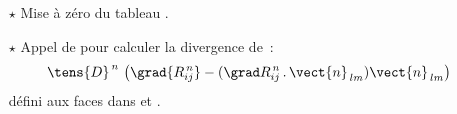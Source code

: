 \begin{itemize}
\begin{itemize}
\begin{itemize}
\item [$\Rightarrow$] calcul de
 $\left[\grad{R^{\,n}_{ij}} - (\grad
R^{\,n}_{ij}\,.\,\vect{n}_{\,lm})\vect{n}_{\,lm}\right]$, les vecteurs \'etant
calcul\'es \`a la face $lm$ :
\begin{equation}\notag
\left\{\begin{array}{lll}
&\displaystyle \var{GRDPX} &= \var{GRDPX} - \displaystyle\frac{\var{GRDSN}}{\var{SURFN2}} \ \var{SURFAC(1,IFAC)}\\
&&\\
&\displaystyle \var{GRDPY} &= \var{GRDPY} - \displaystyle\frac{\var{GRDSN}}{\var{SURFN2}} \ \var{SURFAC(2,IFAC)} \\
&&\\
&\displaystyle \var{GRDPZ} &= \var{GRDPZ} - \displaystyle\frac{\var{GRDSN}}{\var{SURFN2}} \ \var{SURFAC(3,IFAC)}
\end{array}\right.
\end{equation}
\item [$\Rightarrow$] finalisation du calcul de l'expression totalement
explicite
 $$\left[ \tens{D}^n\,\left( \grad{R^{\,n}_{ij}} - (\grad R^{\,n}_{ij}\,.\,\vect{n}_{\,lm})\,\vect{n}_{\,lm}\right) \right]\,.\,\vect{n}_{\,lm}$$
\begin{equation}\notag
\begin{array} {ll}
\displaystyle \var{VISCF} = &
 \displaystyle\frac{1}{2} (\ \var{W4(II)} +\ \var{W4(JJ)}) \ \var{GRDPX} \
\var{SURFAC(1,IFAC)})\ + \\
&\\
&  \displaystyle\frac{1}{2} (\ \var{W5(II)} +\ \var{W5(JJ)}) \ \var{GRDPY} \
\var{SURFAC(2,IFAC)})\ + \\
&\\
&  \displaystyle\frac{1}{2} (\ \var{W6(II)} +\ \var{W6(JJ)}) \ \var{GRDPZ} \ \var{SURFAC(3,IFAC)})
\end{array}
\end{equation}
\end{itemize}

\item [$\star$] Mise \`a z\'ero du tableau .

\item [$\star$] Appel de  pour calculer la divergence de~:
 $$\tens{D}^{\,n}\,\left( \grad{R^{\,n}_{ij}} - (\grad R^{\,n}_{ij}\,.\,\vect{n}_{\,lm})\vect{n}_{\,lm}\right)$$ d\'efini aux faces dans  et .


\end{itemize}
\end{itemize}

